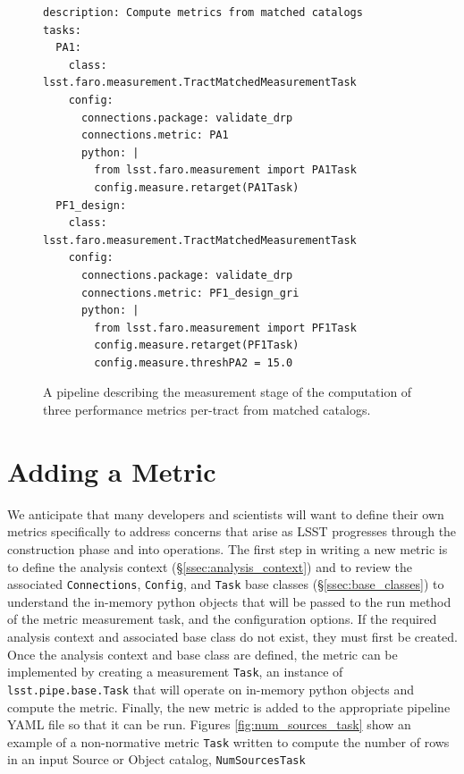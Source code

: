\begin{figure}[!ht]
  \lstset{language=YAML}
  \begin{lstlisting}
description: Compute metrics from matched catalogs
tasks:
  PA1:
    class: lsst.faro.measurement.TractMatchedMeasurementTask
    config:
      connections.package: validate_drp
      connections.metric: PA1
      python: |
        from lsst.faro.measurement import PA1Task
        config.measure.retarget(PA1Task)
  PF1_design:
    class: lsst.faro.measurement.TractMatchedMeasurementTask
    config:
      connections.package: validate_drp
      connections.metric: PF1_design_gri
      python: |
        from lsst.faro.measurement import PF1Task
        config.measure.retarget(PF1Task)
        config.measure.threshPA2 = 15.0
    \end{lstlisting}
  \caption{A \faro pipeline describing the measurement stage of the computation of three performance metrics per-tract from matched catalogs.}
  \label{fig:faro_pipeline}
\end{figure}

\section{Adding a  Metric} \label{sec:add}

We anticipate that many developers and scientists will want to define their own metrics specifically to address concerns that arise as LSST progresses through the construction phase and into operations.
The first step in writing a new metric is to define the analysis context (\S \ref{ssec:analysis_context}) and to review the associated \texttt{Connections}, \texttt{Config}, and \texttt{Task} base classes (\S \ref{ssec:base_classes}) to understand the in-memory python objects that will be passed to the run method of the metric measurement task, and the configuration options.
If the required analysis context and associated base class do not exist, they must first be created. 
Once the analysis context and base class are defined, the metric can be implemented by creating a measurement \texttt{Task}, an instance of \texttt{lsst.pipe.base.Task} that will operate on in-memory python objects and compute the metric. 
Finally, the new metric is added to the appropriate pipeline YAML file so that it can be run.
Figures \ref{fig:num_sources_task} show an example of a non-normative metric \texttt{Task} written to compute the number of rows in an input Source or Object catalog, \texttt{NumSourcesTask}

